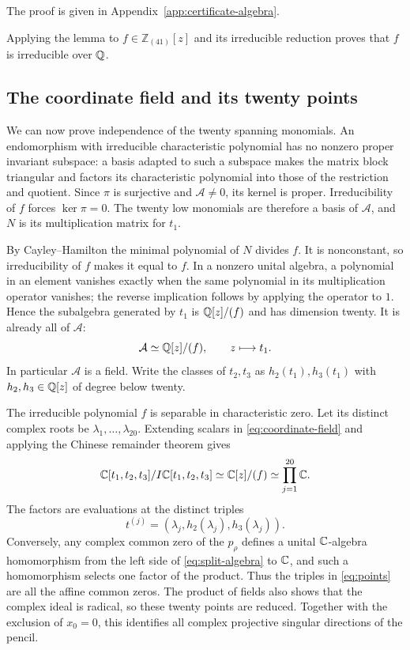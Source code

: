 The proof is given in Appendix~\ref{app:certificate-algebra}.

Applying the lemma to $f\in\mathbb Z_{(41)}[z]$ and its irreducible
reduction proves that $f$ is irreducible over $\mathbb Q$.

\subsection{The coordinate field and its twenty points}

We can now prove independence of the twenty spanning monomials.
An endomorphism
with irreducible characteristic polynomial has no nonzero proper invariant
subspace: a basis adapted to such a subspace makes the matrix block
triangular and factors its characteristic polynomial into those of the
restriction and quotient.  Since $\pi$ is surjective and
$\mathcal A\ne0$, its kernel is proper.  Irreducibility of $f$ forces
$\ker\pi=0$.  The twenty low monomials are therefore a basis of
$\mathcal A$, and $N$ is its multiplication matrix for $t_1$.

By Cayley--Hamilton the minimal polynomial of $N$ divides $f$.  It is
nonconstant, so irreducibility of $f$ makes it equal to $f$.  In a nonzero
unital algebra, a polynomial in an element vanishes exactly when the
same polynomial in its multiplication operator vanishes; the reverse
implication follows by applying the operator to $1$.  Hence the
subalgebra generated by $t_1$ is $\mathbb Q[z]/(f)$ and has dimension twenty.
It is already all of $\mathcal A$:
\begin{equation}
 \mathcal A\simeq\mathbb Q[z]/(f),\qquad z\longmapsto t_1.
 \label{eq:coordinate-field}
\end{equation}
In particular $\mathcal A$ is a field.  Write the classes of $t_2,t_3$
as $h_2(t_1),h_3(t_1)$ with $h_2,h_3\in\mathbb Q[z]$ of degree below twenty.

The irreducible polynomial $f$ is separable in characteristic zero.
Let its distinct complex roots be $\lambda_1,\ldots,\lambda_{20}$.
Extending scalars in \eqref{eq:coordinate-field} and applying the Chinese
remainder theorem gives
\begin{equation}
 \mathbb C[t_1,t_2,t_3]/I\mathbb C[t_1,t_2,t_3]
 \simeq\mathbb C[z]/(f)\simeq\prod_{j=1}^{20}\mathbb C.
 \label{eq:split-algebra}
\end{equation}
The factors are evaluations at the distinct triples
\begin{equation}
 t^{(j)}=(\lambda_j,h_2(\lambda_j),h_3(\lambda_j)).
 \label{eq:points}
\end{equation}
Conversely, any complex common zero of the $p_\rho$ defines a unital
$\mathbb C$-algebra homomorphism from the left side of
\eqref{eq:split-algebra} to $\mathbb C$, and such a homomorphism selects one
factor of the product.  Thus the triples in \eqref{eq:points} are all the
affine common zeros.  The product of fields also shows that the complex
ideal is radical, so these twenty points are reduced.  Together with the
exclusion of $x_0=0$, this identifies all complex projective singular
directions of the pencil.


